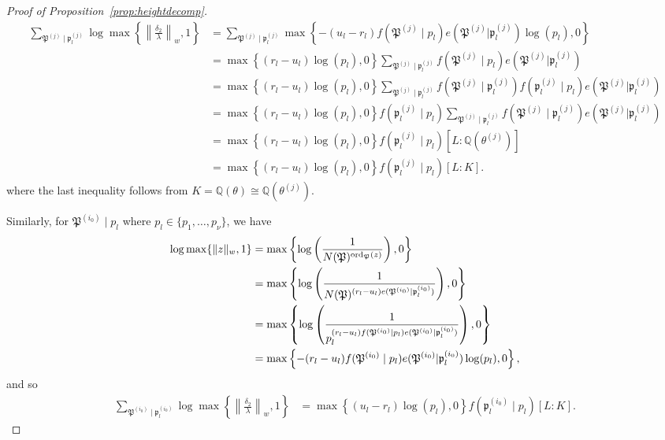 \begin{proof}[Proof of Proposition~\ref{prop:heightdecomp}]
\begin{align*}
\sum_{\mathfrak{P}^{(j)} \mid \mathfrak{p}_l^{(j)}} \log \max \left\{ \left\|\frac{\delta_2}{\lambda}\right\|_{w}, 1\right\}
	& = \sum_{\mathfrak{P}^{(j)} \mid \mathfrak{p}_l^{(j)}} \max \left\{ -(u_l - r_l)f(\mathfrak{P}^{(j)}\mid p_l)e(\mathfrak{P}^{(j)}|\mathfrak{p}_l^{(j)})\log(p_l), 0\right\}\\
	& = \max \left\{ (r_l - u_l)\log(p_l), 0\right\}\sum_{\mathfrak{P}^{(j)} \mid \mathfrak{p}_l^{(j)}}f(\mathfrak{P}^{(j)}\mid p_l)e(\mathfrak{P}^{(j)}|\mathfrak{p}_l^{(j)})\\
	& = \max \left\{ (r_l - u_l)\log(p_l), 0\right\}\sum_{\mathfrak{P}^{(j)} \mid \mathfrak{p}_l^{(j)}}f(\mathfrak{P}^{(j)}\mid \mathfrak{p}_l^{(j)})f(\mathfrak{p}_l^{(j)}\mid p_l)e(\mathfrak{P}^{(j)}|\mathfrak{p}_l^{(j)})\\
	& = \max \left\{ (r_l - u_l)\log(p_l), 0\right\}f(\mathfrak{p}_l^{(j)}\mid p_l)\sum_{\mathfrak{P}^{(j)} \mid \mathfrak{p}_l^{(j)}}f(\mathfrak{P}^{(j)}\mid \mathfrak{p}_l^{(j)})e(\mathfrak{P}^{(j)}|\mathfrak{p}_l^{(j)})\\
	& = \max \left\{ (r_l - u_l)\log(p_l), 0\right\}f(\mathfrak{p}_l^{(j)}\mid p_l)[L:\mathbb{Q}(\theta^{(j)})]\\
	& = \max \left\{ (r_l - u_l)\log(p_l), 0\right\}f(\mathfrak{p}_l^{(j)}\mid p_l)[L:K].
\end{align*}
where the last inequality follows from $K = \mathbb{Q}(\theta) \cong \mathbb{Q}(\theta^{(j)})$.

Similarly, for $\mathfrak{P}^{(i_0)}\mid p_l$ where $p_l \in \{p_1, \dots, p_{\nu}\}$, we have
\begin{align*}
 \log \max \{ \|z\|_{w}, 1\}	
 	& = \max \left\{ \log\left(\frac{1}{N(\mathfrak{P})^{\operatorname{ord}_{\mathfrak{P}}(z)}} \right), 0\right\}\\
	& = \max \left\{ \log\left(\frac{1}{N(\mathfrak{P})^{(r_l - u_l)e(\mathfrak{P}^{(i_0)}|\mathfrak{p}_l^{(i_0)})}} \right), 0\right\}\\
	& = \max \left\{ \log\left(\frac{1}{p_l^{(r_l - u_l)f(\mathfrak{P}^{(i_0)}\mid p_l)e(\mathfrak{P}^{(i_0)}|\mathfrak{p}_l^{(i_0)})}} \right), 0\right\}\\
	& = \max \left\{ -(r_l - u_l)f(\mathfrak{P}^{(i_0)}\mid p_l)e(\mathfrak{P}^{(i_0)}|\mathfrak{p}_l^{(i_0)})\log(p_l), 0\right\},
\end{align*}
and so
\begin{align*}
\sum_{\mathfrak{P}^{(i_0)} \mid \mathfrak{p}_l^{(i_0)}} \log \max \left\{ \left\|\frac{\delta_2}{\lambda}\right\|_{w}, 1\right\}
	& = \max \left\{ (u_l - r_l)\log(p_l), 0\right\}f(\mathfrak{p}_l^{(i_0)}\mid p_l)[L:K].
\end{align*}


\end{proof}
